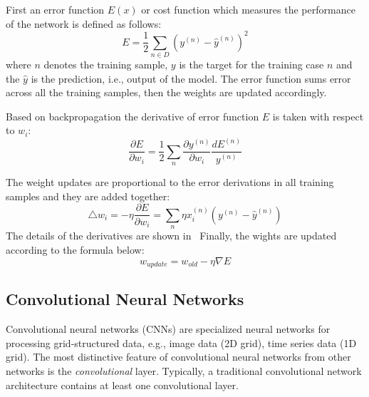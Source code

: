 First an error function $E(x)$ or cost function which measures the performance of the network is defined as follows:%
\begin{equation}
    E= \frac{1}{2}\sum_{n\in D} (y^{(n)}-\hat{y}^{(n)})^2
\end{equation}
where $n$ denotes the training sample, $y$ is the target for the training case $n$ and the $\hat{y}$ is the prediction, i.e., output of the model. The error function sums error across all the training samples, then the weights are updated accordingly. 

Based on backpropagation the derivative of error function $E$ is taken with respect to $w_i$:
\begin{equation}
    \frac{\partial E}{\partial w_i}=\frac{1}{2}\sum_{n} \frac{\partial y^{(n)}}{\partial w_i} \frac{dE^{(n)}}{y^{(n)}}
\end{equation}

The weight updates are proportional to the error derivations in all training samples and they are added together:
\begin{equation}
    \triangle w_i = - \eta \frac{\partial E}{\partial w_i} = \sum_{n} \eta x_i^{(n)} (y^{(n)} - \hat{y}^{(n)})
\end{equation}
The details of the derivatives are shown in~\cite{}
Finally, the wights are updated according to the formula below:
\begin{equation}
   w_{update}= w_{old}-\eta \nabla E
\end{equation}
    
\subsection{Convolutional Neural Networks}
\label{subsec:CNNs}
Convolutional neural networks (CNNs) are specialized neural networks for processing grid-structured data, e.g., image data (2D grid), time series data (1D grid). The most distinctive feature of convolutional neural networks from other networks is the \textit{convolutional} layer. Typically, a traditional convolutional  network architecture contains at least one convolutional layer. 

